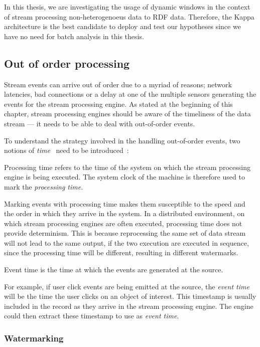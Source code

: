 In this thesis, we are investigating the usage of dynamic windows in the context of stream processing 
non-heterogenoeus data to RDF data. 
Therefore, the Kappa architecture is the best candidate to deploy and test our 
hypotheses since we have no need for batch analysis in this thesis.  

\subsection{Out of order processing}%
\label{sub:Out of order processing}
Stream events can arrive out of order due to a myriad of reasons; network latencies, 
bad connections or a delay at one of the multiple sensors generating the events for 
the stream processing engine. As stated at the beginning of this chapter, stream 
processing engines should be aware of the timeliness of the data stream --- it needs 
to be able to deal with out-of-order events. 

To understand the strategy involved in the handling out-of-order events, 
two notions of \emph{time}~ need to be introduced~\cite{watermark_flink}:  

\begin{defn}
    Processing time refers to the time of the system on which the stream processing 
    engine is being executed. The system clock of the machine is therefore used 
    to mark the \emph{processing time}. 
\end{defn}
Marking events with processing time makes them 
susceptible to the speed and the order in which they arrive in the system. 
In a distributed environment, on which stream processing engines are often 
executed, processing time does not provide determinism. This is because 
reprocessing the same set of data stream will not lead to the same output, if 
the two execution are executed in sequence, since the processing time will be 
different, resulting in different watermarks. 


\begin{defn}
    Event time is the time at which the events are generated at the source.
\end{defn}
For example, if user click events are being emitted at the
source, the \emph{event time} will be the time the user clicks on an object of 
interest. This timestamp is usually included in the record as they arrive 
in the stream processing engine. The engine could then extract these 
timestamp to use as \emph{event time}. 


\subsubsection{Watermarking}%
\label{ssub:Watermarking}

